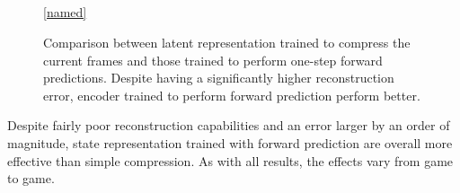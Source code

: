 \begin{figure}[!t]
  \captionsetup[subfloat]{position=top,labelformat=empty}
  \vspace{-1.5cm}
  \centering

    \subfloat[]{  \resizebox{0.4\textwidth}{!}{}}
    \subfloat[]{  \resizebox{0.4\textwidth}{!}{}}\\
  \vspace{-1cm}
    \subfloat[]{  \resizebox{0.4\textwidth}{!}{}}
    \subfloat[]{  \resizebox{0.4\textwidth}{!}{}}\\
  \vspace{-1cm}
    \subfloat[]{  \resizebox{0.4\textwidth}{!}{}}
    \subfloat[]{  \resizebox{0.4\textwidth}{!}{}}\\
  \vspace{-1cm}
    \subfloat[]{  \resizebox{0.4\textwidth}{!}{}}
  \\

  \ref{named}
  \caption{Comparison between latent representation trained to compress the current frames and 
  those trained to perform one-step forward predictions. Despite having a significantly higher reconstruction error,
encoder trained to perform forward prediction perform better.}
  \label{fig:forward-vs-compression}
\end{figure}


Despite fairly poor reconstruction capabilities and an error larger by an order of magnitude, 
state representation trained with forward 
prediction are overall more effective than simple compression.
As with all results, the effects vary from game to game.


